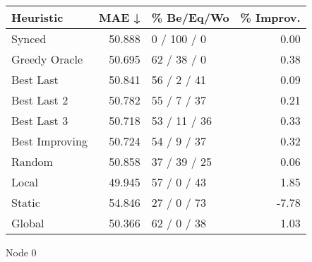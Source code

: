 \begin{tabular}{lrlr}
\toprule
\textbf{Heuristic} & \textbf{MAE ↓} & \textbf{\% Be/Eq/Wo} & \textbf{\% Improv.} \\
\midrule
            Synced &         50.888 &          0 / 100 / 0 &                0.00 \\
     Greedy Oracle &         50.695 &          62 / 38 / 0 &                0.38 \\
         Best Last &         50.841 &          56 / 2 / 41 &                0.09 \\
       Best Last 2 &         50.782 &          55 / 7 / 37 &                0.21 \\
       Best Last 3 &         50.718 &         53 / 11 / 36 &                0.33 \\
    Best Improving &         50.724 &          54 / 9 / 37 &                0.32 \\
            Random &         50.858 &         37 / 39 / 25 &                0.06 \\
             Local &         49.945 &          57 / 0 / 43 &                1.85 \\
            Static &         54.846 &          27 / 0 / 73 &               -7.78 \\
            Global &         50.366 &          62 / 0 / 38 &                1.03 \\
\bottomrule
\end{tabular}
\caption{Node 0}
\label{tab:iid_lr01_le1_bs4_0}
